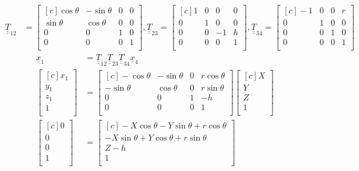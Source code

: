 \documentclass[onecolumn,10pt]{jhwhw}
\def\du#1{\underline{\underline{#1}}}
\begin{document}
\begin{align*}
\du{T}_{12} &=
\begin{bmatrix*}[c]
\cos \theta & - \sin \theta & 0 & 0 \\
\sin \theta &   \cos \theta & 0 & 0 \\
0 & 0 & 1 & 0\\
0 & 0 & 0 & 1\\
\end{bmatrix*},
\du{T}_{23} =
\begin{bmatrix*}[c]
1 & 0 & 0 & 0\\
0 & 1 & 0 & 0\\
0 & 0 & -1 & h\\
0 & 0 & 0 & 1\\
\end{bmatrix*},
\du{T}_{34} =
\begin{bmatrix*}[c]
-1 & 0 & 0 & r\\
0 & 1 & 0 & 0\\
0 & 0 & 1 & 0\\
0 & 0 & 0 & 1\\
\end{bmatrix*}
\end{align*}
\begin{align*}
\underline{x}_1 &= \du{T}_{12} \du{T}_{23} \du{T}_{34} \underline{x}_4 \\
\begin{bmatrix*}[c]
x_1 \\
y_1 \\
z_1 \\
1 \\
\end{bmatrix*}
& =
\begin{bmatrix*}[c]
-\cos \theta & -\sin \theta & 0 & r \cos \theta \\
-\sin \theta &  \cos \theta & 0 & r \sin \theta \\
         0 &           0 & 1 &            -h \\
         0 &           0 & 0 &            1 \\
\end{bmatrix*}
\begin{bmatrix*}[c]
X \\
Y \\
Z \\
1 \\
\end{bmatrix*}\\
\begin{bmatrix*}[c]
0 \\
0 \\
0 \\
1 \\
\end{bmatrix*} &=
\begin{bmatrix*}[c]
-X \cos \theta - Y \sin \theta + r \cos \theta \\
-X \sin \theta + Y \cos \theta + r \sin \theta \\
                                     Z - h \\
                                         1 \\
\end{bmatrix*}
\end{align*}
\end{document}
